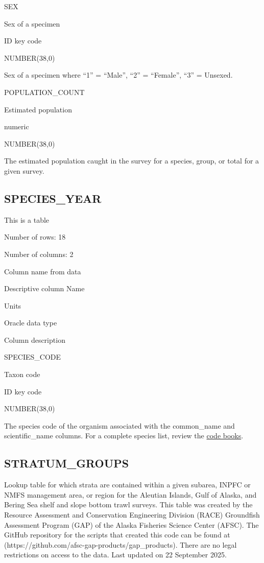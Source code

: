 \documentclass[
  letterpaper,
  oneside,
  open=any]{scrbook}
\begin{document}
SEX

Sex of a specimen

ID key code

NUMBER(38,0)

Sex of a specimen where ``1'' = ``Male'', ``2'' = ``Female'', ``3'' =
Unsexed.

POPULATION\_COUNT

Estimated population

numeric

NUMBER(38,0)

The estimated population caught in the survey for a species, group, or
total for a given survey.

\subsection{SPECIES\_YEAR}\label{species_year}

This is a table

Number of rows: 18

Number of columns: 2

Column name from data

Descriptive column Name

Units

Oracle data type

Column description

SPECIES\_CODE

Taxon code

ID key code

NUMBER(38,0)

The species code of the organism associated with the common\_name and
scientific\_name columns. For a complete species list, review the
\href{https://www.fisheries.noaa.gov/resource/document/groundfish-survey-species-code-manual-and-data-codes-manual}{code
books}.

\subsection{STRATUM\_GROUPS}\label{stratum_groups}

Lookup table for which strata are contained within a given subarea,
INPFC or NMFS management area, or region for the Aleutian Islands, Gulf
of Alaska, and Bering Sea shelf and slope bottom trawl surveys. This
table was created by the Resource Assessment and Conservation
Engineering Division (RACE) Groundfish Assessment Program (GAP) of the
Alaska Fisheries Science Center (AFSC). The GitHub repository for the
scripts that created this code can be found at
(https://github.com/afsc-gap-products/gap\_products). There are no legal
restrictions on access to the data. Last updated on 22 September 2025.
\end{document}
